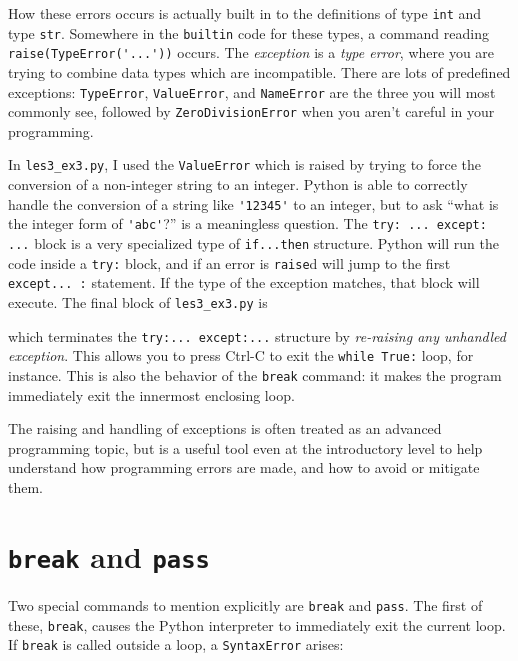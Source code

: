 \documentclass[m3380-lec-main.tex]{subfiles}
\begin{document}
\smallskip\noindent
How these errors occurs is actually built in to the definitions of type \verb|int| and type \verb|str|. Somewhere in the \verb|builtin| code for these types, a command reading \verb|raise(TypeError('...'))| occurs. The \emph{exception} is a \emph{type error}, where you are trying to combine data types which are incompatible. There are lots of predefined exceptions: \verb|TypeError|, \verb|ValueError|, and \verb|NameError| are the three you will most commonly see, followed by \verb|ZeroDivisionError| when you aren't careful in your programming.

In \verb|les3_ex3.py|, I used the \verb|ValueError| which is raised by trying to force the conversion of a non-integer string to an integer. Python is able to correctly handle the conversion of a string like \verb|'12345'| to an integer, but to ask ``what is the integer form of \verb|'abc'|?'' is a meaningless question. The \verb|try: ... except: ...| block is a very specialized type of \verb|if...then| structure. Python will run the code inside a \verb|try:| block, and if an error is \verb|raise|d will jump to the first \verb|except... :| statement. If the type of the exception matches, that block will execute. The final block of \verb|les3_ex3.py| is

\smallskip\noindent
which terminates the \verb|try:... except:...| structure by \emph{re-raising any unhandled exception}. This allows you to press Ctrl-C to exit the \verb|while True:| loop, for instance. This is also the behavior of the \verb|break| command: it makes the program immediately exit the innermost enclosing loop.

The raising and handling of exceptions is often treated as an advanced programming topic, but is a useful tool even at the introductory level to help understand how programming errors are made, and how to avoid or mitigate them.

\section{\texttt{break} and \texttt{pass}}
Two special commands to mention explicitly are \verb|break| and \verb|pass|. The first of these, \verb|break|, causes the Python interpreter to immediately exit the current loop. If \verb|break| is called outside a loop, a \verb|SyntaxError| arises:
\end{document}
